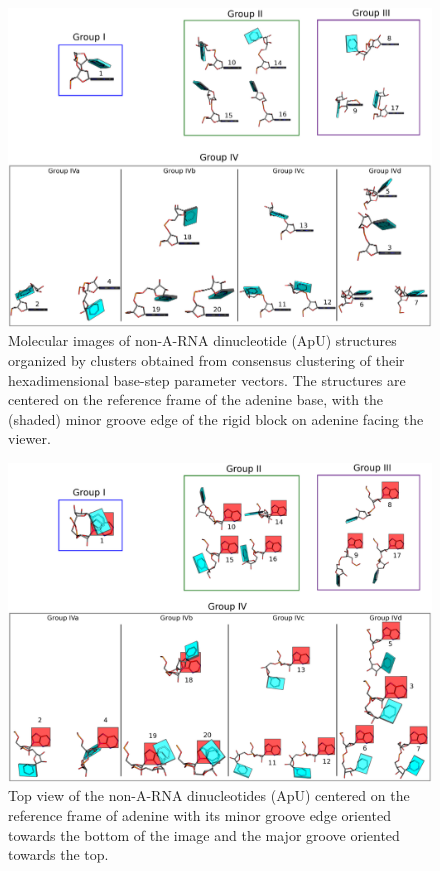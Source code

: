 \begin{figure}[htbp]
 \centering
\includegraphics[angle=90, scale=0.45]{Chapter2/collageb.png}
 \caption{Molecular images of  non-A-RNA dinucleotide (ApU) structures
   organized by  clusters obtained from consensus  clustering of their
   hexadimensional  base-step parameter  vectors.  The  structures are
   centered  on the  reference frame  of  the adenine  base, with  the
   (shaded) minor groove edge of the rigid block on adenine facing the
   viewer.}
 \label{fig:nonAclus}
\end{figure}

\begin{figure}
\centering
\includegraphics[angle=90, scale=0.48]{Chapter2/collage2.png}
\caption{Top view of the non-A-RNA dinucleotides (ApU) centered on the
  reference frame of adenine with its minor  groove edge oriented
  towards  the bottom  of  the  image and  the  major groove  oriented
  towards the top.}
\label{fig:steps2}
\end{figure}

